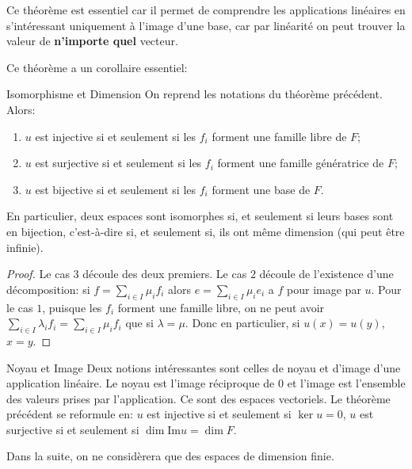 \documentclass{classe}
\begin{document}
Ce théorème est essentiel car il permet de comprendre les applications linéaires en s'intéressant uniquement à l'image d'une base, car par linéarité on peut trouver la valeur de \textbf{n'importe quel} vecteur.

Ce théorème a un corollaire essentiel:
\begin{théorème}{Isomorphisme et Dimension}{}
	On reprend les notations du théorème précédent. Alors:
	\begin{enumerate}
		\item $u$ est injective si et seulement si les $f_{i}$ forment une famille libre de $F$;
		\item $u$ est surjective si et seulement si les $f_{i}$ forment une famille génératrice de $F$;
		\item $u$ est bijective si et seulement si les $f_{i}$ forment une base de $F$.
	\end{enumerate}
	En particulier, deux espaces sont isomorphes si, et seulement si leurs bases sont en bijection, c'est-à-dire si, et seulement si, ils ont même dimension (qui peut être infinie).
\end{théorème}
\begin{proof}
	Le cas $3$ découle des deux premiers.
	Le cas $2$ découle de l'existence d'une décomposition: si $f = \sum_{i\in I}\mu_{i}f_{i}$ alors $e = \sum_{i\in I}\mu_{i}e_{i}$ a $f$ pour image par $u$.
	Pour le cas $1$, puisque les $f_{i}$ forment une famille libre, on ne peut avoir $\sum_{i \in I}\lambda_{i}f_{i} = \sum_{i\in I}\mu_{i}f_{i}$ que si $\lambda = \mu$.
	Donc en particulier, si $u(x) = u(y)$, $x = y$.
\end{proof}

\begin{remarque}{Noyau et Image}{}
Deux notions intéressantes sont celles de noyau et d'image d'une application linéaire. Le noyau est l'image réciproque de $0$ et l'image est l'ensemble des valeurs prises par l'application.
Ce sont des espaces vectoriels.
Le théorème précédent se reformule en: $u$ est injective si et seulement si $\ker u = 0$, $u$ est surjective si et seulement si $\dim \mathrm{Im} u = \dim F$.
\end{remarque}

Dans la suite, on ne considèrera que des espaces de dimension finie.
\end{document}

